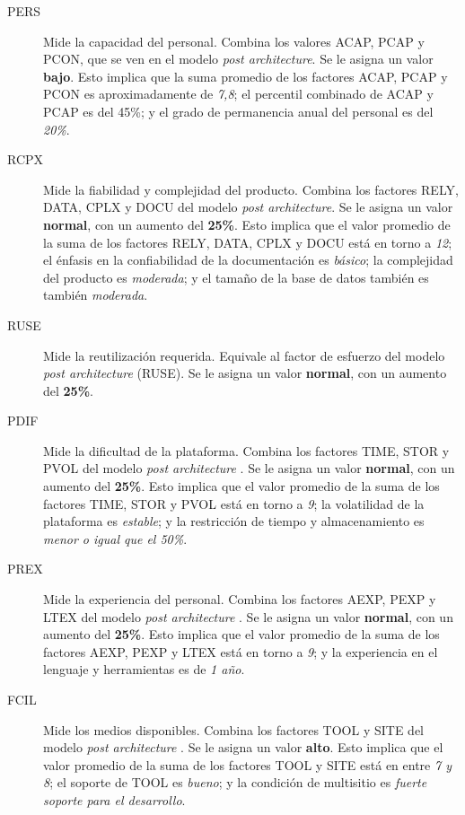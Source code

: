 \documentclass[11pt,a4paper,spanish,twoside]{book}
\begin{document}
\begin{description}
\item[PERS] Mide la capacidad del personal. Combina los valores ACAP, PCAP y
PCON, que se ven en el modelo \emph{post architecture}. Se le asigna un
valor \textbf{bajo}. Esto implica que la suma promedio de los factores
ACAP, PCAP y PCON es aproximadamente de \emph{7,8}; el percentil combinado
de ACAP y PCAP es del 45\%; y el grado de permanencia anual del personal es
del \emph{20\%}.

\item[RCPX] Mide la fiabilidad y complejidad del producto. Combina los
factores RELY, DATA, CPLX y DOCU del modelo \emph{post architecture}. Se le
asigna un valor \textbf{normal}, con un aumento del \textbf{25\%}. Esto
implica que el valor promedio de la suma de los factores RELY, DATA, CPLX y
DOCU está en torno a \emph{12}; el énfasis en la confiabilidad de la
documentación es \emph{básico}; la complejidad del producto es
\emph{moderada}; y el tamaño de la base de datos también es también
\emph{moderada}.

\item[RUSE] Mide la reutilización requerida. Equivale al factor de esfuerzo
del modelo \emph{post architecture} (RUSE). Se le asigna un valor
\textbf{normal}, con un aumento del \textbf{25\%}.

\item[PDIF] Mide la dificultad de la plataforma. Combina los factores TIME, 
STOR y PVOL del modelo \emph{post architecture} . Se le asigna un valor
\textbf{normal}, con un aumento del \textbf{25\%}. Esto implica que el valor 
promedio de la suma de los factores TIME, STOR y PVOL está en torno a \emph{9};
la volatilidad de la plataforma es \emph{estable}; y la restricción de tiempo y
almacenamiento es \emph{menor o igual que el 50\%}.

\item[PREX] Mide la experiencia del personal. Combina los factores AEXP, PEXP y
LTEX del modelo \emph{post architecture} . Se le asigna un valor 
\textbf{normal}, con un aumento del \textbf{25\%}. Esto implica que el valor 
promedio de la suma de los factores AEXP, PEXP y LTEX está en torno a \emph{9};
y la experiencia en el lenguaje y herramientas es de \emph{1 año}.

\item[FCIL] Mide los medios disponibles. Combina los factores TOOL y SITE del 
modelo \emph{post architecture} . Se le asigna un valor \textbf{alto}. Esto 
implica que el valor promedio de la suma de los factores TOOL y SITE está en 
entre \emph{7 y 8}; el soporte de TOOL es \emph{bueno}; y la condición de 
multisitio es \emph{fuerte soporte para el desarrollo}.

\end{description}
\end{document}
